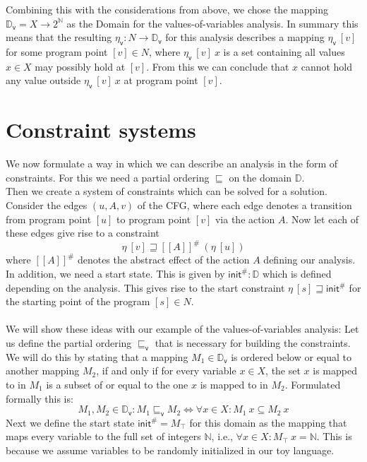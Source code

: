     Combining this with the considerations from above, we chose the mapping $\mathbb{D}_\textsf{v} = X \rightarrow 2^\mathbb{N}$ as the Domain for the values-of-variables analysis. In summary this means that the resulting $\eta_\textsf{v}: N \rightarrow \mathbb{D}_\textsf{v}$ for this analysis describes a mapping $\eta_\textsf{v}\ [v]$ for some program point $[v] \in N$, where $\eta_\textsf{v}\ [v]\ x$ is a set containing all values $x \in X$ may possibly hold at $[v]$. From this we can conclude that $x$ cannot hold any value outside $\eta_\textsf{v}\ [v]\ x$ at program point $[v]$.

  \section{Constraint systems}
    We now formulate a way in which we can describe an analysis in the form of constraints. For this we need a partial ordering $\sqsubseteq$ on the domain $\mathbb{D}$.\\
    Then we create a system of constraints which can be solved for a solution. Consider the edges $(u, A, v)$ of the \ac{CFG}, where each edge denotes a transition from program point $[u]$ to program point $[v]$ via the action $A$. Now let each of these edges give rise to a constraint
    \[\eta\ [v] \sqsupseteq [\![A]\!]^{\#}\ (\eta\ [u])\]
    where $[\![A]\!]^{\#}$ denotes the abstract effect of the action $A$ defining our analysis. In addition, we need a start state. This is given by $\textsf{init}^{\#}: \mathbb{D}$ which is defined depending on the analysis. This gives rise to the start constraint $\eta\ [s] \sqsupseteq \textsf{init}^{\#}$ for the starting point of the program $[s] \in N$.\\
    \\
    We will show these ideas with our example of the values-of-variables analysis: Let us define the partial ordering $\sqsubseteq_\textsf{v}$ that is necessary for building the constraints. We will do this by stating that a mapping $M_1 \in \mathbb{D}_\textsf{v}$ is ordered below or equal to another mapping $M_2$, if and only if for every variable $x \in X$, the set $x$ is mapped to in $M_1$ is a subset of or equal to the one $x$ is mapped to in $M_2$. Formulated formally this is:
    \[M_1, M_2 \in \mathbb{D}_\textsf{v}: M_1 \sqsubseteq_\textsf{v} M_2 \Longleftrightarrow \forall x \in X: M_1\ x \subseteq M_2\ x\]
    Next we define the start state $\textsf{init}^{\#} = M_\top$ for this domain as the mapping that maps every variable to the full set of integers $\mathbb{N}$, i.e., $\forall x \in X: M_\top\ x = \mathbb{N}$. This is because we assume variables to be randomly initialized in our toy language.\\
